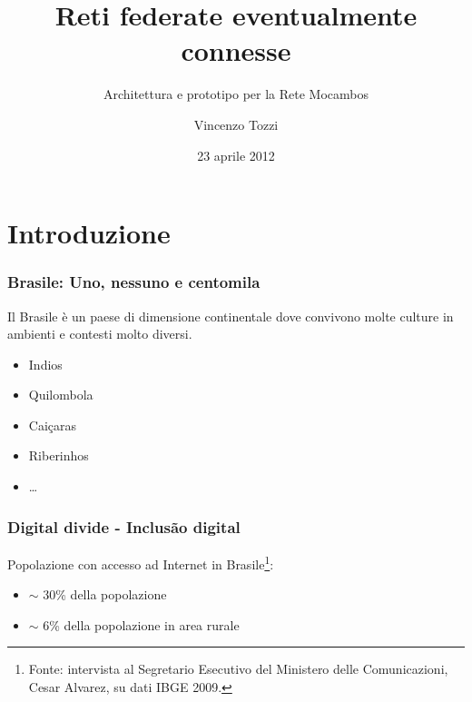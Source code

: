 \documentclass{beamer}
\title{Reti federate eventualmente connesse}
\subtitle{Architettura e prototipo per la Rete Mocambos}
\author{Vincenzo Tozzi}
\institute{Universit\`a degli Studi di Firenze - Corso di Laurea in Informatica}
\date{23 aprile 2012}
\begin{document}
{
%
\begin{frame}
  \titlepage
\end{frame}
}

\section[Sommario]{}
\begin{frame}
  \tableofcontents
\end{frame}

\section{Introduzione}
\begin{frame}

  \frametitle{Brasile: Uno, nessuno e centomila}
  Il Brasile è un paese di dimensione continentale dove convivono
  molte culture in ambienti e contesti molto diversi. 
  \begin{itemize}
  \item Indios
  \item Quilombola
  \item Caiçaras
  \item Riberinhos
  \item \ldots
  \end{itemize}

\end{frame}

\begin{frame}

  \frametitle{Digital divide - Inclusão digital}
  Popolazione con accesso ad Internet in Brasile\footnote{Fonte: intervista al Segretario Esecutivo del Ministero delle
    Comunicazioni, Cesar Alvarez, su dati IBGE 2009.}:
  \begin{itemize}
    \item $\sim$ 30\% della popolazione
    \item $\sim$ 6\% della popolazione in area rurale  
  \end{itemize}
    
\end{frame}
\end{document}
